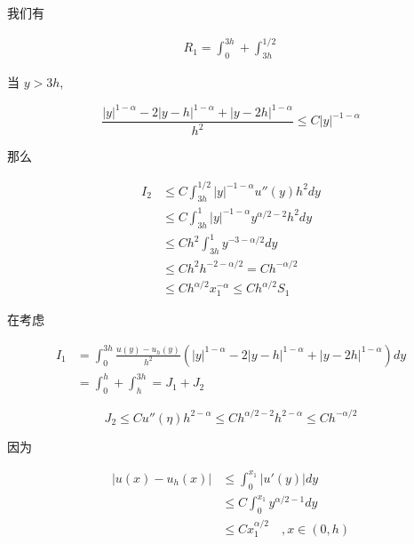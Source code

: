 \documentclass{ctexart}
\begin{document}
我们有

\begin{equation}
    \begin{aligned}
        R_1 = \int_0^{3h} + \int_{3h}^{1/2}
    \end{aligned}
\end{equation}

当 \(y>3h\), 

\begin{equation}
    \frac{ |y|^{1-\alpha} - 2|y-h|^{1-\alpha} + |y-2h|^{1-\alpha} }{h^2} \le C |y|^{-1-\alpha}
\end{equation}

那么

\begin{equation}
    \begin{aligned}
            I_2 &\le  C \int_{3h}^{1/2} |y|^{-1-\alpha} u''(y) h^2 dy   \\
            & \le  C \int_{3h}^{1} |y|^{-1-\alpha} y^{\alpha/2-2} h^2 dy    \\
            & \le C h^{2}  \int_{3h}^{1} y^{-3-\alpha/2} dy  \\
            & \le C h^{2} h^{-2-\alpha/2} = C h^{-\alpha/2}   \\
            & \le C h^{\alpha/2} x_1^{-\alpha} \le C h^{\alpha/2} S_1
    \end{aligned}
\end{equation}

在考虑

\begin{equation}
    \begin{aligned}
        I_1 &= \int_0^{3h}  \frac{ u(y) - u_h(y) }{h^2} (|y|^{1-\alpha} - 2|y-h|^{1-\alpha} + |y-2h|^{1-\alpha}) dy \\
        &= \int_0^h + \int_h^{3h} = J_1 + J_2
    \end{aligned}
\end{equation}

\begin{equation}
    J_2 \le C u''(\eta) h^{2-\alpha} \le C h^{\alpha/2-2} h^{2-\alpha} \le C h^{-\alpha/2}
\end{equation}

因为

\begin{equation}
    \begin{aligned}
        |u(x) - u_h(x)| &\le \int_0^{x_1} |u'(y)| dy    \\
        &\le C \int_0^{x_1} y^{\alpha/2-1} dy   \\
        &\le C x_1^{\alpha/2}    \quad , x\in (0, h)
    \end{aligned}
\end{equation}
\end{document}
